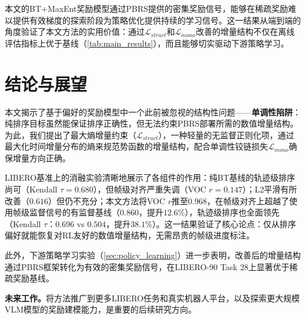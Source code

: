 本文的BT+MaxEnt奖励模型通过PBRS提供的密集奖励信号，能够在稀疏奖励难以提供有效梯度的探索阶段为策略优化提供持续的学习信号。这一结果从端到端的角度验证了本文方法的实用价值：通过$\mathcal{L}_{struct}$和$\mathcal{L}_{mono}$改善的增量结构不仅在离线评估指标上优于基线（\cref{tab:main_results}），而且能够切实驱动下游策略学习。


\clearpage


\section{结论与展望}
\label{sec:conclusion}

本文揭示了基于偏好的奖励模型中一个此前被忽视的结构性问题——\textbf{单调性陷阱}：纯排序目标虽然能保证排序正确性，但无法约束PBRS部署所需的数值增量结构。为此，我们提出了最大熵增量约束（$\mathcal{L}_{struct}$），一种轻量的无监督正则化项，通过最大化时间增量分布的熵来规范势函数的增量结构，配合单调性铰链损失$\mathcal{L}_{mono}$确保增量方向正确。

LIBERO基准上的消融实验清晰地展示了各组件的作用：纯BT基线的轨迹级排序尚可（Kendall $\tau = 0.680$），但帧级对齐严重失调（VOC $r = 0.147$）；L2平滑有所改善（$0.616$）但仍不充分；本文方法将VOC $r$推至$0.968$，在帧级对齐上超越了使用帧级监督信号的有监督基线（$0.860$，提升$12.6\%$），轨迹级排序也全面领先（Kendall $\tau$：$0.696$ vs $0.504$，提升$38.1\%$）。这一结果验证了核心论点：仅从排序偏好就能恢复对RL友好的数值增量结构，无需昂贵的帧级进度标注。

此外，下游策略学习实验（\cref{sec:policy_learning}）进一步表明，改善后的增量结构通过PBRS框架转化为有效的密集奖励信号，在LIBERO-90 Task 28上显著优于稀疏奖励基线。

\textbf{未来工作。}将方法推广到更多LIBERO任务和真实机器人平台，以及探索更大规模VLM模型的奖励建模能力，是重要的后续研究方向。



